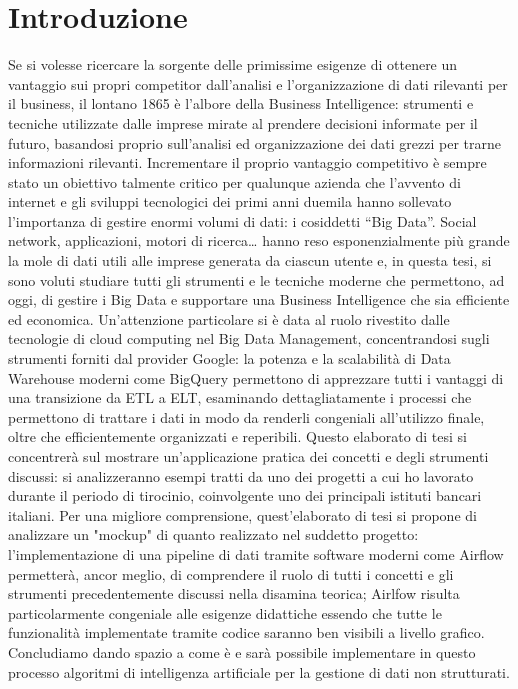 \documentclass[a4paper,12pt]{report}
\begin{document}

\renewcommand{\contentsname}{Indice}
\setcounter{tocdepth}{3}
\setcounter{secnumdepth}{3}
\tableofcontents
\fancyhead{} %

\listoffigures

\listoftables


\chapter*{Introduzione}
\fancyhead{} %

Se si volesse ricercare la sorgente delle primissime esigenze di ottenere un vantaggio sui propri competitor dall’analisi e l’organizzazione di dati rilevanti per il business, il lontano 1865 è l’albore della Business Intelligence: strumenti e tecniche utilizzate dalle imprese mirate al prendere decisioni informate per il futuro, basandosi proprio sull’analisi ed organizzazione dei dati grezzi per trarne informazioni rilevanti.
Incrementare il proprio vantaggio competitivo è sempre stato un obiettivo talmente critico per qualunque azienda che l’avvento di internet e gli sviluppi tecnologici dei primi anni duemila hanno sollevato l’importanza di gestire enormi volumi di dati: i cosiddetti “Big Data”. Social network, applicazioni, motori di ricerca… hanno reso esponenzialmente più grande la mole di dati utili alle imprese generata da ciascun utente e, in questa tesi, si sono voluti studiare tutti gli strumenti e le tecniche moderne che permettono, ad oggi, di gestire i Big Data e supportare una Business Intelligence che sia efficiente ed economica. Un’attenzione particolare si è data al ruolo rivestito dalle tecnologie di cloud computing nel Big Data Management, concentrandosi sugli strumenti forniti dal provider Google: la potenza e la scalabilità di Data Warehouse moderni come BigQuery permettono di apprezzare tutti i vantaggi di una transizione da ETL a ELT, esaminando dettagliatamente i processi che permettono di trattare i dati in modo da renderli congeniali all'utilizzo finale, oltre che efficientemente organizzati e reperibili. Questo elaborato di tesi si concentrerà sul mostrare un’applicazione pratica dei concetti e degli strumenti discussi: si analizzeranno esempi tratti da uno dei progetti a cui ho lavorato durante il periodo di tirocinio, coinvolgente uno dei principali istituti bancari italiani. Per una migliore comprensione, quest'elaborato di tesi si propone di analizzare un "mockup" di quanto realizzato nel suddetto progetto: l'implementazione di una pipeline di dati tramite software moderni come Airflow permetterà, ancor meglio, di comprendere il ruolo di tutti i concetti e gli strumenti precedentemente discussi nella disamina teorica; Airlfow risulta particolarmente congeniale alle esigenze didattiche essendo che tutte le funzionalità implementate tramite codice saranno ben visibili a livello grafico. Concludiamo dando spazio a come è e sarà possibile implementare in questo processo algoritmi di intelligenza artificiale per la gestione di dati non strutturati. 
\end{document}
